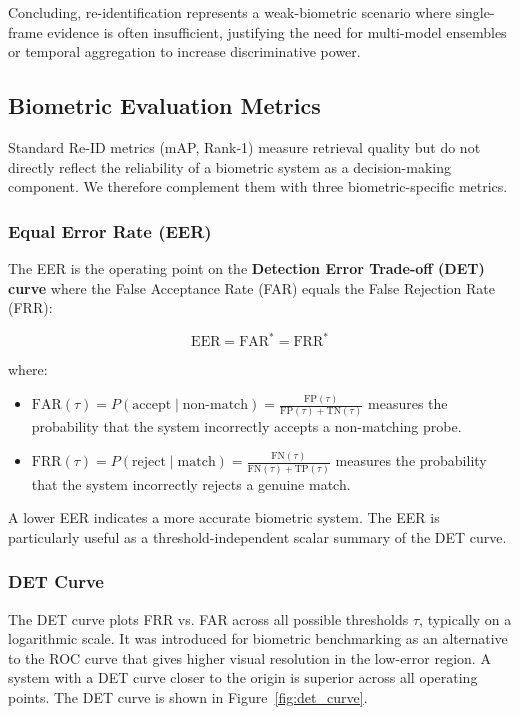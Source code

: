 \documentclass[10pt,twocolumn,letterpaper]{article}
\begin{document}
Concluding, re-identification represents a weak-biometric scenario where single-frame evidence is often insufficient, justifying the need for multi-model ensembles or temporal aggregation to increase discriminative power.

\subsection{Biometric Evaluation Metrics}
\label{sec:biometric_eval}

Standard Re-ID metrics (mAP, Rank-1) measure retrieval quality but do not directly reflect the reliability of a biometric system as a decision-making component. We therefore complement them with three biometric-specific metrics.

\subsubsection{Equal Error Rate (EER)}
The EER is the operating point on the \textbf{Detection Error Trade-off (DET) curve} where the False Acceptance Rate (FAR) equals the False Rejection Rate (FRR):

\begin{equation}
    \text{EER} = \text{FAR}^*=\text{FRR}^*
\end{equation}

where:
\begin{itemize}
    \item $\text{FAR}(\tau) = P(\text{accept} \mid \text{non-match}) = \frac{\text{FP}(\tau)}{\text{FP}(\tau)+\text{TN}(\tau)}$ measures the probability that the system incorrectly accepts a non-matching probe.
    \item $\text{FRR}(\tau) = P(\text{reject} \mid \text{match}) = \frac{\text{FN}(\tau)}{\text{FN}(\tau)+\text{TP}(\tau)}$ measures the probability that the system incorrectly rejects a genuine match.
\end{itemize}

A lower EER indicates a more accurate biometric system. The EER is particularly useful as a threshold-independent scalar summary of the DET curve.

\subsubsection{DET Curve}
The DET curve plots FRR vs. FAR across all possible thresholds $\tau$, typically on a logarithmic scale. It was introduced for biometric benchmarking \cite{martin1997det} as an alternative to the ROC curve that gives higher visual resolution in the low-error region. A system with a DET curve closer to the origin is superior across all operating points. The DET curve is shown in Figure~\ref{fig:det_curve}.
\end{document}
